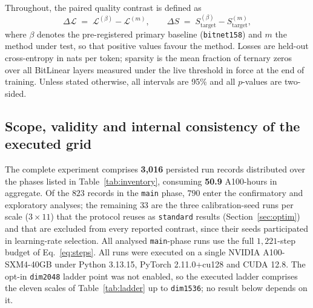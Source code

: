 \documentclass[final,5p,times,twocolumn]{elsarticle}
\theoremstyle{remark}
\newcommand{\dL}{\Delta\mathcal{L}}
\newcommand{\dS}{\Delta S}
\begin{document}
Throughout, the paired quality contrast is defined as
\begin{equation}
\label{eq:dL}
\dL \;=\; \mathcal{L}^{(\beta)} - \mathcal{L}^{(m)},
\qquad
\dS \;=\; S^{(\beta)}_{\mathrm{target}} - S^{(m)}_{\mathrm{target}},
\end{equation}
where $\beta$ denotes the pre-registered primary baseline
(\texttt{bitnet158}) and $m$ the method under test, so that
positive values favour the method. Losses are held-out cross-entropy in
nats per token; sparsity is the mean fraction of ternary zeros over all
BitLinear layers measured under the live threshold in force at the end of
training. Unless stated otherwise, all intervals are 95\% and all $p$-values
are two-sided.

\subsection{Scope, validity and internal consistency of the executed grid}
\label{sec:res-validity}

The complete experiment comprises \textbf{3{,}016} persisted run records
distributed over the phases listed in Table~\ref{tab:inventory}, consuming
\textbf{50.9} A100-hours in aggregate. Of the $823$ records in the
\texttt{main} phase, $790$ enter the confirmatory and exploratory analyses;
the remaining $33$ are the three calibration-seed runs per scale
($3 \times 11$) that the protocol reuses as \texttt{standard} results
(Section~\ref{sec:optim}) and that are excluded from every reported contrast,
since their seeds participated in learning-rate selection. All analysed
\texttt{main}-phase runs use the full $1{,}221$-step budget of
Eq.~\eqref{eq:steps}. All runs were executed on a
single NVIDIA A100-SXM4-40GB under Python 3.13.15, PyTorch 2.11.0+cu128 and
CUDA 12.8. The opt-in \texttt{dim2048} ladder point was not enabled, so the
executed ladder comprises the eleven scales of Table~\ref{tab:ladder} up to
\texttt{dim1536}; no result below depends on it.
\end{document}
